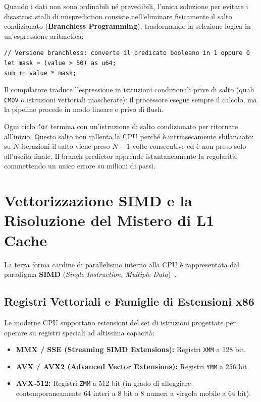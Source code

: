 Quando i dati non sono ordinabili né prevedibili, l'unica soluzione per evitare i disastrosi stalli di misprediction consiste nell'eliminare fisicamente il salto condizionato (\textbf{Branchless Programming}), trasformando la selezione logica in un'espressione aritmetica:
\begin{lstlisting}[style=rustcode]
// Versione branchless: converte il predicato booleano in 1 oppure 0
let mask = (value > 50) as u64;
sum += value * mask;
\end{lstlisting}
Il compilatore traduce l'espressione in istruzioni condizionali prive di salto (quali \texttt{CMOV} o istruzioni vettoriali mascherate): il processore esegue sempre il calcolo, ma la pipeline procede in modo lineare e privo di flush.

\begin{remark}
Ogni ciclo \texttt{for} termina con un'istruzione di salto condizionato per ritornare all'inizio. Questo salto non rallenta la CPU perch\'e \`e intrinsecamente sbilanciato: su $N$ iterazioni il salto viene preso $N-1$ volte consecutive ed \`e non preso solo all'uscita finale. Il branch predictor apprende istantaneamente la regolarit\`a, commettendo un unico errore su milioni di passi.
\end{remark}

\FloatBarrier
\section{Vettorizzazione SIMD e la Risoluzione del Mistero di L1 Cache}
\label{sec:simd-vettorizzazione}

La terza forma cardine di parallelismo interno alla CPU \`e rappresentata dal paradigma \textbf{SIMD} (\textit{Single Instruction, Multiple Data})~\cite{bakhvalov2024,slotin2023}.

\FloatBarrier
\subsection{Registri Vettoriali e Famiglie di Estensioni x86}
\label{subsec:registri-vettoriali}

Le moderne CPU supportano estensioni del set di istruzioni progettate per operare su registri speciali ad altissima capacit\`a:
\begin{itemize}
    \item \textbf{MMX / SSE (Streaming SIMD Extensions):} Registri \texttt{XMM} a 128 bit.
    \item \textbf{AVX / AVX2 (Advanced Vector Extensions):} Registri \texttt{YMM} a 256 bit.
    \item \textbf{AVX-512:} Registri \texttt{ZMM} a 512 bit (in grado di alloggiare contemporaneamente 64 interi a 8 bit o 8 numeri a virgola mobile a 64 bit).
\end{itemize}

